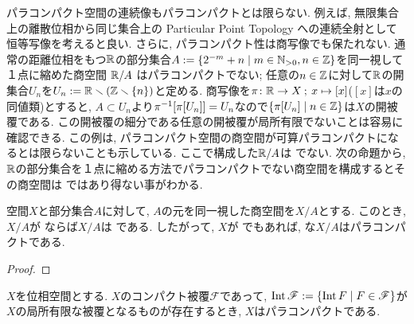 \documentclass[uplatex, dvipdfmx, a4paper, 12pt, class=jsbook, crop=false]{standalone}
\begin{document}
パラコンパクト空間の連続像もパラコンパクトとは限らない.
例えば, 無限集合上の離散位相から同じ集合上の Particular Point Topology への連続全射として恒等写像を考えると良い.
さらに, パラコンパクト性は商写像でも保たれない.
通常の距離位相をもつ$ \mathbb{R} $の部分集合$ A \defeq \setcomp{2^{-m}+n}{m \in \N_{>0}, n \in \Z} $を同一視して１点に縮めた商空間
$ \mathbb{R} / A $ はパラコンパクトでない; 任意の$ n \in \mathbb{Z} $に対して$ \mathbb{R} $の開集合$ U_n $を$ U_n \mathrel{:=} \mathbb{R} \smallsetminus (\mathbb{Z} \smallsetminus \{n\}) $と定める.
商写像を$ \pi\colon\mathbb{R}\to X \mathpunct{\: ; \:} x \mapsto [x] $($ [x] $は$ x $の同値類)とすると,
$ A \subset U_n $より$ \mapinvset{\pi}{\mapset{\pi}{U_n}}= U_n $なので$ \setcomp{\mapset{\pi}{U_n}}{n \in \Z} $は$ X $の開被覆である.
この開被覆の細分である任意の開被覆が局所有限でないことは容易に確認できる.
この例は, パラコンパクト空間の商空間が可算パラコンパクトになるとは限らないことも示している.
ここで構成した$ \mathbb{R} / A $は  でない.
次の命題から, $ \mathbb{R} $の部分集合を１点に縮める方法でパラコンパクトでない商空間を構成するとその商空間は  ではあり得ない事がわかる.

\begin{proposition}
	 空間$ X $と部分集合$ A $に対して, $ A $の元を同一視した商空間を$ X / A $とする.
	このとき, $ X / A $が  ならば$ X / A $は  である.
	したがって, $ X $が \Lindelof でもあれば, な$ X / A $はパラコンパクトである.
\end{proposition}

\begin{proof}
	\WIP
\end{proof}

\begin{proposition}
	\label{prop:existence of a compact covering whose interior is a locally finite covering>ParaCpt}
	$ X $を位相空間とする. $ X $のコンパクト被覆$\mathscr{F}$であって,
	$\topint \mathscr{F} \defeq \setcomp{\topint F}{F \in \mathscr{F}}$が$X$の局所有限な被覆となるものが存在するとき,
	$ X $はパラコンパクトである.
\end{proposition}
\end{document}
